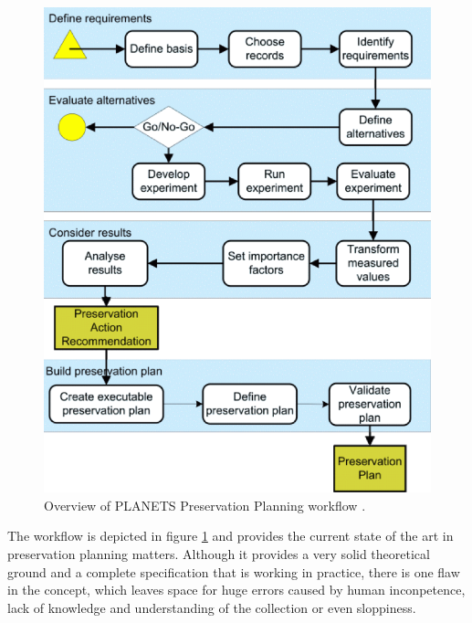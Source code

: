 \begin{figure}[htb]
\begin{center}
\includegraphics[width=4.5in]{figures/contentprofiling/planningworkflow.png}
\caption{Overview of PLANETS Preservation Planning workflow \cite{Becker:2008:PSO:1378889.1378954}.}
\label{fig:planningworkflow}
\end{center}
\end{figure}

The workflow is depicted in figure \ref{fig:planningworkflow} and provides the current state of the art in preservation planning matters. Although it provides a very solid theoretical ground and a complete specification that is working in practice, there is one flaw in the concept, which leaves space for huge errors caused by human inconpetence, lack of knowledge and understanding of the collection or even sloppiness.

